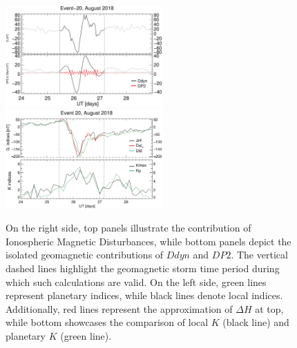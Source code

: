 \documentclass[a4paper,fleqn]{cas-dc}
\begin{document}
\begin{figure}[h!]
       \centerline{\Large \bf   
      \hspace{0.275\textwidth}  \color{black}{}
       \hspace{0.295\textwidth}  \color{black}{}
         \hfill}
	\includegraphics[width=6.0cm]{images/diono/iono_PI_V1_2018-08-24.eps}	
	\includegraphics[width=6.0cm]{images/dH_approx/diono_valid_V4_2018-08-24.eps}	
	       
       \caption{On the right side, top panels illustrate the contribution of Ionospheric Magnetic Disturbances, while bottom panels depict the isolated geomagnetic contributions of $Ddyn$ and $DP2$. The vertical dashed lines highlight the geomagnetic storm time period during which such calculations are valid. On the left side, green lines represent planetary indices, while black lines denote local indices. Additionally, red lines represent the approximation of $\Delta H$ at top, while bottom showcases the comparison of local $K$ (black line) and planetary $K$ (green line).
       }
    \label{fig:iono_valid3}
\end{figure}
\end{document}
